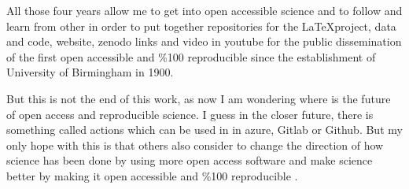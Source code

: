 \documentclass[11pt]{article}
\begin{document}
All those four years allow me to get into open accessible science
and to follow and learn from other in order to put together 
repositories for the \LaTeX project, data and code, website, zenodo links 
and video in youtube for the public dissemination of the first
open accessible and \%100 reproducible since the establishment of 
University of Birmingham in 1900.
 
But this is not the end of this work, as now I am wondering 
where is the future of open access and reproducible science.
I guess in the closer future, there is something called actions 
which can be used in
in azure, Gitlab or Github.
But my only hope with this is that others also consider 
to change the direction of how science has been done by 
using more open access software and make science better 
by making it
open accessible and \%100 reproducible 
\cite{xochicale2019-github}.



\printbibliography
\end{document}
